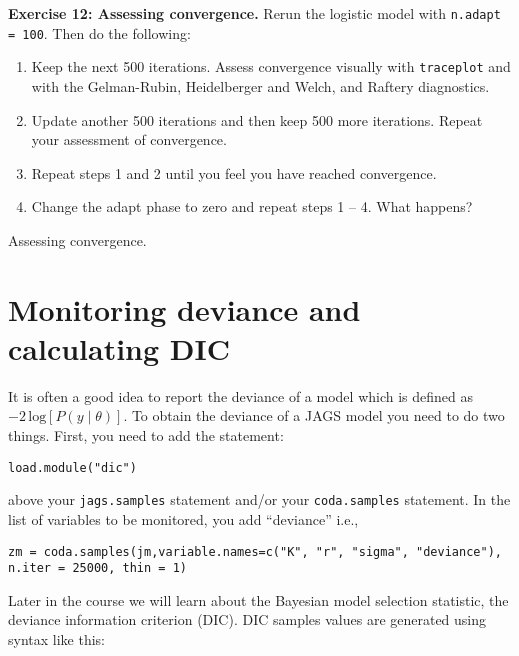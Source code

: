 \documentclass[12pt,english]{article}
\begin{document}
{\bigskip
\belowcaptionskip=-40pt
\begin{exercise}
\begin{mdframed}
\doublespacing
\textbf{Exercise 12: Assessing convergence.} Rerun the logistic model with \texttt{n.adapt = 100}. Then do the following:
\begin{enumerate}
\item Keep the next 500 iterations. Assess convergence visually with \texttt{traceplot} and with the Gelman-Rubin, Heidelberger and Welch, and Raftery diagnostics.
\item Update another 500 iterations and then keep 500 more iterations. Repeat your assessment of convergence. 
\item Repeat steps 1 and 2 until you feel you have reached convergence.
\item Change the adapt phase to zero and repeat steps 1 -- 4. What happens?
\end{enumerate}
\end{mdframed}
\captionsetup{textformat=empty, labelformat=empty}
\caption[Assessing convergence]{Assessing convergence.}
\label{ex:assessing convergence}
\end{exercise}
\belowcaptionskip=0pt

\section{Monitoring deviance and calculating DIC}

It is often a good idea to report the deviance of a model which is defined as $-2\,\textrm{log}\left[P\left(y\mid\theta\right)\right]$. To obtain the deviance of a JAGS model you need to do two things. First, you need to add the statement:

\begin{Verbatim}
load.module("dic")
\end{Verbatim}

\noindent above your \texttt{jags.samples} statement and/or your \texttt{coda.samples} statement. In the list of variables to be monitored, you add \enquote{deviance} i.e.,

\begin{Verbatim}
zm = coda.samples(jm,variable.names=c("K", "r", "sigma", "deviance"), 
n.iter = 25000, thin = 1)
\end{Verbatim}

\noindent Later in the course we will learn about the Bayesian model selection statistic, the deviance information criterion (DIC). DIC samples values are generated using syntax like this:

}
\end{document}
